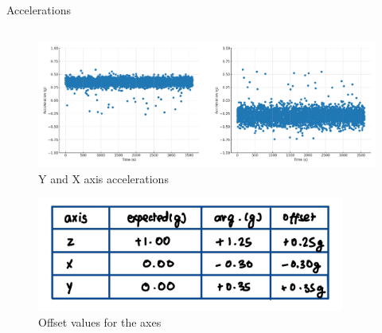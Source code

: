 \begin{frame}{Accelerations}
\begin{columns}[onlytextwidth]
        \begin{column}{0.54\textwidth}
            \vspace{-0.3em}
            \begin{figure}
                \centering
                \includegraphics[height=0.4\textheight,width=1.1\textwidth,keepaspectratio]{images/xy-axis-acceleration.png}
                \caption{Y and X axis accelerations}
            \end{figure}
            \vspace{-1.8em} %
            \begin{figure}
                \centering
                \includegraphics[height=0.25\textheight,width=0.9\textwidth,keepaspectratio]{images/table_axes.jpg}
                \caption{Offset values for the axes}
            \end{figure}
        \end{column}
    \end{columns}
\end{frame}


